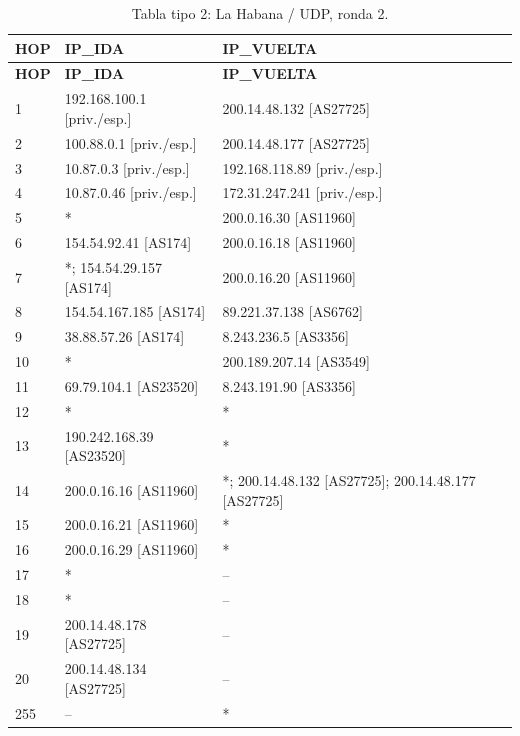 \begin{longtable}{p{0.95cm}p{7.075cm}p{7.075cm}}
\caption{Tabla tipo 2: La Habana / UDP, ronda 2.}\label{tabla2:200.14.48.134:UDP} \\
\toprule
\textbf{HOP} & \textbf{IP\_\allowbreak{}IDA} & \textbf{IP\_\allowbreak{}VUELTA} \\ \midrule
\endfirsthead
\toprule
\textbf{HOP} & \textbf{IP\_\allowbreak{}IDA} & \textbf{IP\_\allowbreak{}VUELTA} \\ \midrule
\endhead
1 & 192.168.100.1 [priv./esp.] & 200.14.48.132 [AS27725] \\
2 & 100.88.0.1 [priv./esp.] & 200.14.48.177 [AS27725] \\
3 & 10.87.0.3 [priv./esp.] & 192.168.118.89 [priv./esp.] \\
4 & 10.87.0.46 [priv./esp.] & 172.31.247.241 [priv./esp.] \\
5 & * & 200.0.16.30 [AS11960] \\
6 & 154.54.92.41 [AS174] & 200.0.16.18 [AS11960] \\
7 & *; 154.54.29.157 [AS174] & 200.0.16.20 [AS11960] \\
8 & 154.54.167.185 [AS174] & 89.221.37.138 [AS6762] \\
9 & 38.88.57.26 [AS174] & 8.243.236.5 [AS3356] \\
10 & * & 200.189.207.14 [AS3549] \\
11 & 69.79.104.1 [AS23520] & 8.243.191.90 [AS3356] \\
12 & * & * \\
13 & 190.242.168.39 [AS23520] & * \\
14 & 200.0.16.16 [AS11960] & *; 200.14.48.132 [AS27725]; 200.14.48.177 [AS27725] \\
15 & 200.0.16.21 [AS11960] & * \\
16 & 200.0.16.29 [AS11960] & * \\
17 & * & -- \\
18 & * & -- \\
19 & 200.14.48.178 [AS27725] & -- \\
20 & 200.14.48.134 [AS27725] & -- \\
255 & -- & * \\
\bottomrule
\end{longtable}
\endgroup
\begingroup
\fontsize{9}{11}\selectfont
